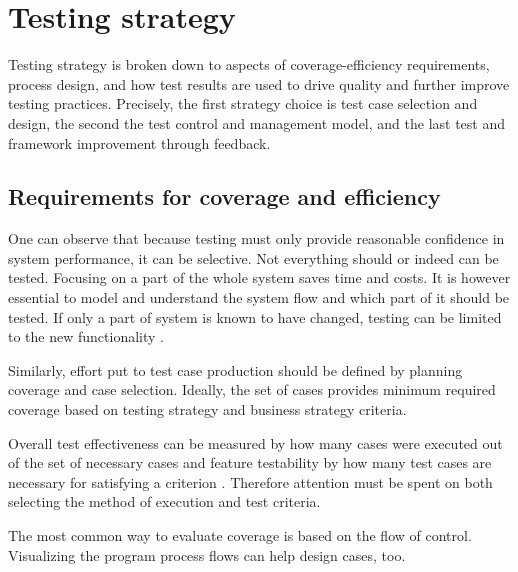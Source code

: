 \documentclass[12pt,a4paper,oneside,pdftex]{report}
\begin{document}
\section{Testing strategy}

Testing strategy is broken down to aspects of coverage-efficiency requirements, process design, and how test results are used to drive quality and further improve testing practices. Precisely, the first strategy choice is test case selection and design, the second the test control and management model, and the last test and framework improvement through feedback.

\subsection{Requirements for coverage and efficiency}

One can observe that because testing must only provide reasonable confidence in system performance, it can be selective. Not everything should or indeed can be tested. Focusing on a part of the whole system saves time and costs. It is however essential to model and understand the system flow and which part of it should be tested. If only a part of system is known to have changed, testing can be limited to the new functionality \citep{bhyan2012survey}. 

Similarly, effort put to test case production should be defined by planning coverage and case selection. Ideally, the set of cases provides minimum required coverage based on testing strategy and business strategy criteria. 

Overall test effectiveness can be measured by how many cases were executed out of the set of necessary cases and feature testability by how many test cases are necessary for satisfying a criterion \citep{linnenkugel1990test}. Therefore attention must be spent on both selecting the method of execution and test criteria. 

The most common way to evaluate coverage is based on the flow of control. Visualizing the program process flows can help design cases, too. \citep{burnstein2003practical} 
\end{document}
